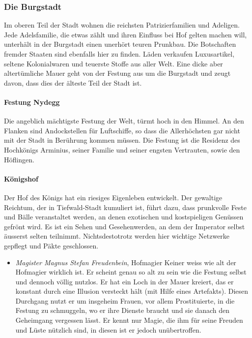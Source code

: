 \documentclass[10pt,twoside,twocolumn,openany]{book}
\begin{document}
\subsubsection{Die Burgstadt}
Im oberen Teil der Stadt wohnen die reichsten Patrizierfamilien und Adeligen. Jede Adelsfamilie, die etwas zählt und ihren Einfluss bei Hof gelten machen will, unterhält in der Burgstadt einen unerhört teuren Prunkbau. Die Botschaften fremder Staaten sind ebenfalls hier zu finden. Läden verkaufen Luxusartikel, seltene Kolonialwaren und teuerste Stoffe aus aller Welt. Eine dicke aber altertümliche Mauer geht von der Festung aus um die Burgstadt und zeugt davon, dass dies der älteste Teil der Stadt ist.

\paragraph{Festung Nydegg} Die angeblich mächtigste Festung der Welt, türmt hoch in den Himmel. An den Flanken sind Andockstellen für Luftschiffe, so dass die Allerhöchsten gar nicht mit der Stadt in Berührung kommen müssen. Die Festung ist die Residenz des Hochkönigs Arminius, seiner Familie und seiner engsten Vertrauten, sowie den Höflingen.

\paragraph{Königshof} Der Hof des Königs hat ein riesiges Eigenleben entwickelt. Der gewaltige Reichtum, der in Tiefwald-Stadt kumuliert ist, führt dazu, dass prunkvolle Feste und Bälle veranstaltet werden, an denen exotischen und kostspieligen Genüssen gefrönt wird. Es ist ein Sehen und Gesehenwerden, an dem der Imperator selbst äusserst selten teilnimmt. Nichtsdestotrotz werden hier wichtige Netzwerke gepflegt und Päkte geschlossen.
\begin{itemize}
	\item\textit{Magister Magnus Stefan Freudenbein}, Hofmagier
	Keiner weiss wie alt der Hofmagier wirklich ist. Er scheint genau so alt zu sein wie die Festung selbst und dennoch völlig nutzlos. Er hat ein Loch in der Mauer kreiert, das er konstant durch eine Illusion versteckt hält (mit Hilfe eines Artefakts). Diesen Durchgang nutzt er um insgeheim Frauen, vor allem Prostituierte, in die Festung zu schmuggeln, wo er ihre Dienste braucht und sie danach den Geheimgang vergessen lässt. Er kennt nur Magie, die ihm für seine Freuden und Lüste nützlich sind, in diesen ist er jedoch unübertroffen.
\end{itemize}
\end{document}
